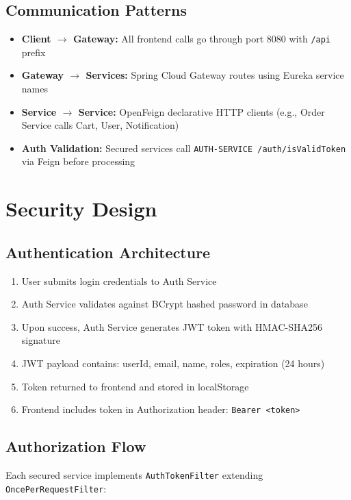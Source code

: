 \subsection{Communication Patterns}

\begin{itemize}
    \item \textbf{Client $\rightarrow$ Gateway:} All frontend calls go through port 8080 with \texttt{/api} prefix
    \item \textbf{Gateway $\rightarrow$ Services:} Spring Cloud Gateway routes using Eureka service names
    \item \textbf{Service $\rightarrow$ Service:} OpenFeign declarative HTTP clients (e.g., Order Service calls Cart, User, Notification)
    \item \textbf{Auth Validation:} Secured services call \texttt{AUTH-SERVICE /auth/isValidToken} via Feign before processing
\end{itemize}

\section{Security Design}

\subsection{Authentication Architecture}

\begin{enumerate}
    \item User submits login credentials to Auth Service
    \item Auth Service validates against BCrypt hashed password in database
    \item Upon success, Auth Service generates JWT token with HMAC-SHA256 signature
    \item JWT payload contains: userId, email, name, roles, expiration (24 hours)
    \item Token returned to frontend and stored in localStorage
    \item Frontend includes token in Authorization header: \texttt{Bearer <token>}
\end{enumerate}

\subsection{Authorization Flow}

Each secured service implements \texttt{AuthTokenFilter} extending \texttt{OncePerRequestFilter}:

